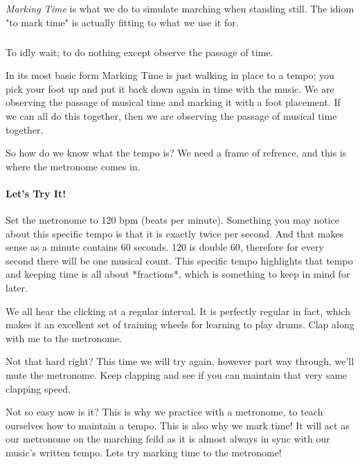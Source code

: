 \documentclass[12pt,letterpaper]{book}
\begin{document}
\textit{Marking Time} is what we do to simulate marching when standing still.  The idiom "to mark time" is actually fitting to what we use it for.

\subparagraph{}To idly wait; to do nothing except observe the passage of time.

In its most basic form Marking Time is just walking in place to a tempo; you pick your foot up and put it back down again in time with the music.  We are observing the passage of musical time and marking it with a foot placement.  If we can all do this together, then we are observing the passage of musical time together.  

So how do we know what the tempo is?  We need a frame of refrence, and this is where the metronome comes in.

\paragraph{Let's Try It!}

Set the metronome to 120 bpm (beats per minute).  Something you may notice about this specific tempo is that it is exactly twice per second.  And that makes sense as a minute contains 60 seconds.  120 is double 60, therefore for every second there will be one musical count.  This specific tempo highlights that tempo and keeping time is all about *fractions*, which is something to keep in mind for later.

We all hear the clicking at a regular interval.  It is perfectly regular in fact, which makes it an excellent set of training wheels for learning to play drums.  Clap along with me to the metronome.


Not that hard right?  This time we will try again, however part way through, we'll mute the metronome.  Keep clapping and see if you can maintain that very same clapping speed.  


Not so easy now is it?  This is why we practice with a metronome, to teach ourselves how to maintain a tempo.  This is also why we mark time!  It will act as our metronome on the marching feild as it is almost always in sync with our music's written tempo.  Lets try marking time to the metronome!
\end{document}
